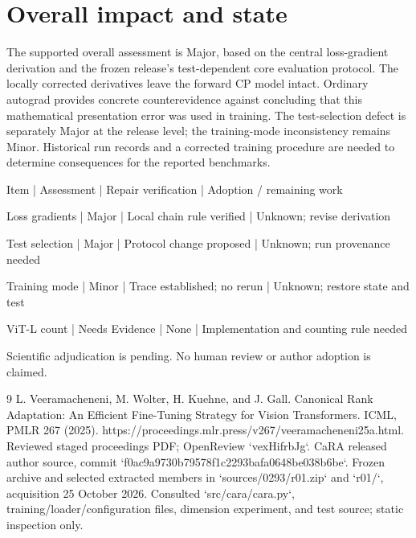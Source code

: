 \documentclass[10pt]{article}
\begin{document}
\section*{Overall impact and state}
The supported overall assessment is Major, based on the central loss-gradient derivation and the frozen release’s test-dependent core evaluation protocol. The locally corrected derivatives leave the forward CP model intact. Ordinary autograd provides concrete counterevidence against concluding that this mathematical presentation error was used in training. The test-selection defect is separately Major at the release level; the training-mode inconsistency remains Minor. Historical run records and a corrected training procedure are needed to determine consequences for the reported benchmarks.\par
Item | Assessment | Repair verification | Adoption / remaining work\par
Loss gradients | Major | Local chain rule verified | Unknown; revise derivation\par
Test selection | Major | Protocol change proposed | Unknown; run provenance needed\par
Training mode | Minor | Trace established; no rerun | Unknown; restore state and test\par
ViT-L count | Needs Evidence | None | Implementation and counting rule needed\par
Scientific adjudication is pending. No human review or author adoption is claimed.\par
9 L. Veeramacheneni, M. Wolter, H. Kuehne, and J. Gall. Canonical Rank Adaptation: An Efficient Fine-Tuning Strategy for Vision Transformers. ICML, PMLR 267 (2025). https://proceedings.mlr.press/v267/veeramacheneni25a.html. Reviewed staged proceedings PDF; OpenReview `vexHifrbJg`. CaRA released author source, commit `f0ac9a9730b79578f1c2293bafa0648be038b6be`. Frozen archive and selected extracted members in `sources/0293/r01.zip` and `r01/`, acquisition 25 October 2026. Consulted `src/cara/cara.py`, training/loader/configuration files, dimension experiment, and test source; static inspection only.\par
\end{document}
